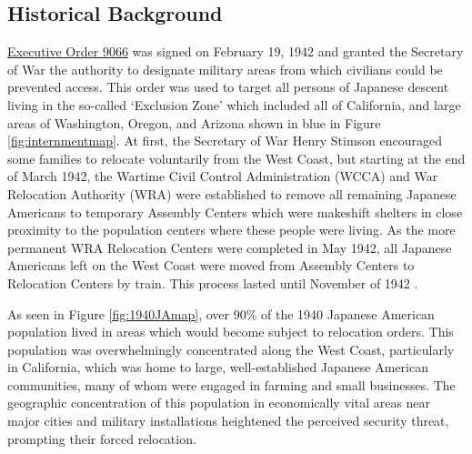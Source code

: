 \subsection{\label{sec:history}Historical Background}
\href{https://www.archives.gov/milestone-documents/executive-order-9066}{Executive Order 9066} 
was signed on February 19, 1942 and granted the Secretary of War the authority
to designate military areas from which civilians could be prevented access. This
order was used to target all persons of Japanese descent living in the so-called
`Exclusion Zone' which included all of California, and large areas of
Washington, Oregon, and Arizona shown in blue in Figure \ref{fig:internmentmap}.
At first, the Secretary of War Henry Stimson encouraged some families 
to relocate voluntarily from the West Coast,
but starting at the end of March 1942, 
the Wartime Civil Control Administration (WCCA) and War Relocation Authority (WRA)
were established to remove all remaining Japanese Americans to temporary
Assembly Centers which were makeshift shelters in close proximity to the
population centers where these people were living. As the more permanent WRA
Relocation Centers were completed in May 1942, all Japanese Americans left
on the West Coast were moved from Assembly Centers to Relocation Centers by
train. This process lasted until November of 1942
\citep{commissiononwartimerelocationPersonalJusticeDenied1983, denshoencyclopediacontributorsResettlementDenshoEncyclopedia2020}
.

As seen in Figure \ref{fig:1940JAmap}, over 90\% of the 1940 Japanese American
population lived in areas which would become subject to relocation orders.
This population was overwhelmingly concentrated along the West Coast, 
particularly in California,
which was home to large, well-established Japanese American communities,
many of whom were engaged in farming and small businesses.
The geographic concentration of this population 
in economically vital areas near major cities and military installations 
heightened the perceived security threat,
prompting their forced relocation.

